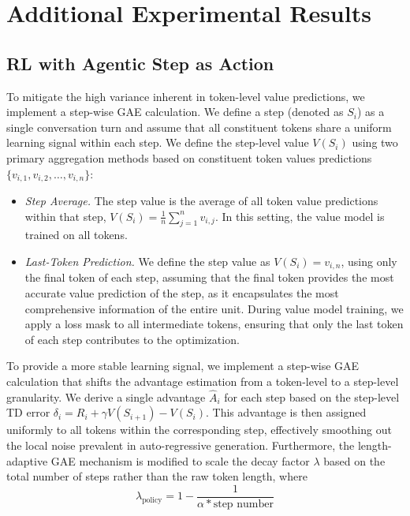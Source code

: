 \section{Additional Experimental Results}

\subsection{RL with Agentic Step as Action}
To mitigate the high variance inherent in token-level value predictions, we implement a step-wise GAE calculation. We define a step (denoted as $S_i$) as a single conversation turn and assume that all constituent tokens share a uniform learning signal within each step. We define the step-level value $V(S_i)$ using two primary aggregation methods based on constituent token values predictions $\{v_{i,1}, v_{i,2}, \dots, v_{i,n}\}$: 

\begin{itemize}[leftmargin=*,itemsep=0pt,parsep=0.2em,topsep=0.3em,partopsep=0.3em]
\item \textit{Step Average.} The step value is the average of all token value predictions within that step, $V(S_i) = \frac{1}{n} \sum_{j=1}^{n} v_{i,j}$. In this setting, the value model is trained on all tokens. 
\item \textit{Last-Token Prediction.} We define the step value as $V(S_i) = v_{i,n}$, using only the final token of each step, assuming that the final token provides the most accurate value prediction of the step, as it encapsulates the most comprehensive information of the entire unit. During value model training, we apply a loss mask to all intermediate tokens, ensuring that only the last token of each step contributes to the optimization.
\end{itemize}

To provide a more stable learning signal, we implement a step-wise GAE calculation that shifts the advantage estimation from a token-level to a step-level granularity. We derive a single advantage $\hat{A}_i$ for each step based on the step-level TD error $\delta_i = R_i + \gamma V(S_{i+1}) - V(S_i)$. This advantage is then assigned uniformly to all tokens within the corresponding step, effectively smoothing out the local noise prevalent in auto-regressive generation. Furthermore, the length-adaptive GAE mechanism is modified to scale the decay factor $\lambda$ based on the total number of steps rather than the raw token length, where $$\lambda_{\text{policy}} = 1 - \frac{1}{\alpha * \text{step number}}$$


